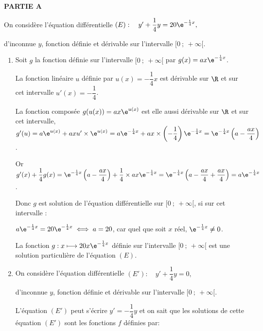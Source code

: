 
\medskip

\textbf{PARTIE A}

\medskip

On considère l'équation différentielle 
$(E) : \quad y' +\dfrac14y = 20\e^{-\frac14 x},$

d'inconnue $y$, fonction définie et dérivable sur l'intervalle $[0~;~ +\infty[$.

\medskip

\begin{enumerate}
\item %
Soit $g$ la fonction  définie sur l'intervalle $[0~;~+\infty[$ par $g(x) = ax\e^{-\frac14 x}$.

La fonction linéaire $u$ définie par $u(x) = - \dfrac14 x$ est dérivable sur $\R$ et sur cet intervalle $u'(x) = - \dfrac14$.

La fonction composée $g(u(x)) = ax\e^{u(x)}$ est elle aussi dérivable sur $\R$ et sur cet intervalle, $g'(u) = a\e^{u(x)} + axu' \times \e^{u(x)} = a\e^{-\frac14 x} + ax \times \left(- \dfrac14 \right)\e^{-\frac14 x} = \e^{-\frac14 x}\left(a - \dfrac{ax}{4}\right)$.

Or $g'(x) + \dfrac14g(x) = \e^{-\frac14 x}\left(a - \dfrac{ax}{4}\right) + \dfrac14 \times ax\e^{-\frac14 x} = \e^{-\frac14 x}\left(a - \dfrac{ax}{4} + \dfrac{ax}{4} \right) = a\e^{-\frac14 x}$.

Donc $g$ est solution de l'équation différentielle sur $[0~;~ +\infty[$, si sur cet intervalle :

$a\e^{-\frac14 x} = 20\e^{-\frac14 x} \iff a = 20$, car quel que soit $x$ réel, $\e^{-\frac14 x} \ne 0$.

La fonction $g : x \longmapsto 20x \e^{-\frac14 x}$ définie sur l'intervalle $[0~;~ +\infty[$ est une solution particulière de l'équation $(E)$.

\item On considère l'équation différentielle 
$(E') : \quad y' +\dfrac14 y = 0,$

d'inconnue $y$, fonction définie et dérivable sur l'intervalle $[0~;~ +\infty[$.

L'équation $(E')$ peut s'écrire $y' = - \dfrac14y$ et on sait que les solutions de cette équation $(E')$ sont les fonctions $f$ définies par:


\end{enumerate}
